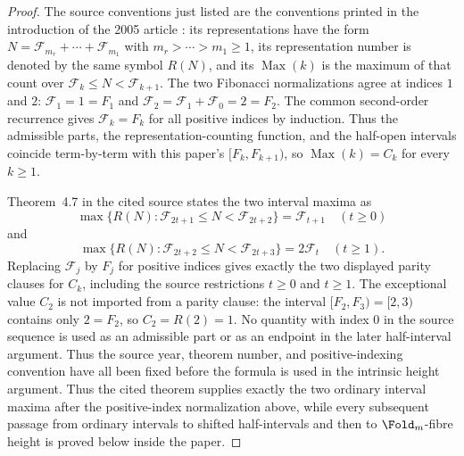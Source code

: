\begin{proof}
The source conventions just listed are the conventions printed in the
introduction of the 2005 article \cite{KocabovaMasakovaPelantova2005}: its representations have
the form \(N=\mathcal F_{m_r}+\cdots+\mathcal F_{m_1}\) with
\(m_r>\cdots>m_1\ge1\), its representation number is denoted by the same symbol
\(R(N)\), and its \(\operatorname{Max}(k)\) is the maximum of that count over
\(\mathcal F_k\le N<\mathcal F_{k+1}\).  The two Fibonacci normalizations agree at
indices \(1\) and \(2\): \(\mathcal F_1=1=F_1\) and
\(\mathcal F_2=\mathcal F_1+\mathcal F_0=2=F_2\).  The common second-order
recurrence gives \(\mathcal F_k=F_k\) for all positive indices by induction.
Thus the admissible parts, the representation-counting function, and the
half-open intervals coincide term-by-term with this paper's
\([F_k,F_{k+1})\), so \(\operatorname{Max}(k)=C_k\) for every \(k\ge1\).

Theorem~4.7 in the cited source states the two interval maxima as
\[
  \max\{R(N):\mathcal F_{2t+1}\le N<\mathcal F_{2t+2}\}=\mathcal F_{t+1}
  \quad(t\ge0)
\]
and
\[
  \max\{R(N):\mathcal F_{2t+2}\le N<\mathcal F_{2t+3}\}=2\mathcal F_t
  \quad(t\ge1).
\]
Replacing \(\mathcal F_j\) by \(F_j\) for positive indices gives exactly the two
displayed parity clauses for \(C_k\), including the source restrictions
\(t\ge0\) and \(t\ge1\).  The exceptional value \(C_2\) is not imported from a
parity clause:
the interval \([F_2,F_3)=[2,3)\) contains only \(2=F_2\), so \(C_2=R(2)=1\).
No quantity with index \(0\) in the source sequence is used as an admissible part
or as an endpoint in the later half-interval argument.  Thus the source year,
theorem number, and positive-indexing convention have all been fixed before the
formula is used in the intrinsic height argument.
Thus the cited theorem supplies exactly the two ordinary interval maxima after
the positive-index normalization above, while every subsequent passage from
ordinary intervals to shifted half-intervals and then to \(\Fold_m\)-fibre height
is proved below inside the paper.
\end{proof}

